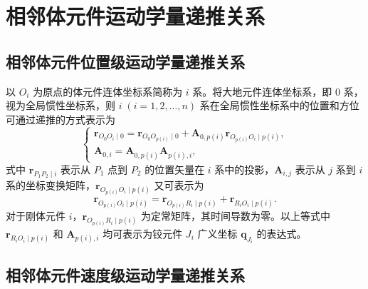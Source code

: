 \section{相邻体元件运动学量递推关系}

\subsection{相邻体元件位置级运动学量递推关系}

以 $O_i$ 为原点的体元件连体坐标系简称为 $i$ 系。将大地元件连体坐标系，即 $0$ 系，视为全局惯性坐标系，则 $i\;(i=1,2,\ldots,n)$ 系在全局惯性坐标系中的位置和方位可通过递推的方式表示为
\begin{equation}\label{eq:10.3}
  \begin{cases}
    \boldsymbol{r}_{O_0 O_i \mid 0} = \boldsymbol{r}_{O_0 O_{p(i)} \mid 0} + \boldsymbol{A}_{0,p(i)} \boldsymbol{r}_{O_{p(i)} O_i \mid p(i)}, \\
    \boldsymbol{A}_{0,i} = \boldsymbol{A}_{0,p(i)} \boldsymbol{A}_{p(i),i},
  \end{cases}
\end{equation}
式中 $\boldsymbol{r}_{P_1 P_2 \mid i}$ 表示从 $P_1$ 点到 $P_2$ 的位置矢量在 $i$ 系中的投影，$\boldsymbol{A}_{i,j}$ 表示从 $j$ 系到 $i$ 系的坐标变换矩阵，$\boldsymbol{r}_{O_{p(i)} O_i \mid p(i)}$ 又可表示为
\begin{equation}\label{eq:10.4}
  \boldsymbol{r}_{O_{p(i)} O_i \mid p(i)} = \boldsymbol{r}_{O_{p(i)} R_i \mid p(i)} + \boldsymbol{r}_{R_i O_i \mid p(i)}.
\end{equation}
对于刚体元件 $i$，$\boldsymbol{r}_{O_{p(i)} R_i \mid p(i)}$ 为定常矩阵，其时间导数为零。以上等式中 $\boldsymbol{r}_{R_i O_i \mid p(i)}$ 和 $\boldsymbol{A}_{p(i),i}$ 均可表示为铰元件 $J_i$ 广义坐标 $\boldsymbol{q}_{J_i}$ 的表达式。

\subsection{相邻体元件速度级运动学量递推关系}

